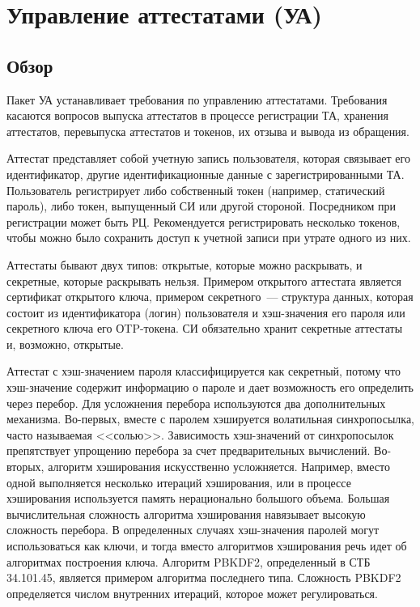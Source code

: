 \section{Управление аттестатами (УА)}\label{CM}

\subsection{Обзор}\label{CM.Intro}

Пакет УА устанавливает требования по управлению аттестатами.
Требования касаются вопросов выпуска аттестатов в процессе регистрации ТА,
хранения аттестатов, перевыпуска аттестатов и токенов, их отзыва и вывода из
обращения.

Аттестат представляет собой учетную запись пользователя, которая связывает
его идентификатор, другие идентификационные данные с зарегистрированными ТА.
%
Пользователь регистрирует либо собственный токен (например, статический пароль), 
либо токен, выпущенный СИ или другой стороной. 
%
Посредником при регистрации может быть РЦ. Рекомендуется регистрировать 
несколько токенов, чтобы можно было сохранить доступ к учетной записи при 
утрате одного из них.


Аттестаты бывают двух типов: открытые, которые можно раскрывать, и 
секретные, которые раскрывать нельзя. 
%
Примером открытого аттестата является сертификат открытого ключа, примером 
секретного~--- структура данных, которая состоит из идентификатора 
(логин) пользователя и хэш-значения его пароля или секретного ключа его 
ОTP-токена.
%
СИ обязательно хранит секретные аттестаты и, возможно, открытые.

Аттестат с хэш-значением пароля классифицируется как секретный, потому что 
хэш-значение содержит информацию о пароле и дает возможность его определить
через перебор.
%
Для усложнения перебора используются два дополнительных механизма.
%
Во-первых, вместе с паролем хэшируется волатильная синхропосылка, часто 
называемая <<солью>>. Зависимость хэш-значений от синхропосылок препятствует 
упрощению перебора за счет предварительных вычислений.
%
Во-вторых, алгоритм хэширования искусственно усложняется. Например, вместо одной
выполняется несколько итераций хэширования, или в процессе хэширования 
используется память нерационально большого объема.
%
Большая вычислительная сложность алгоритма хэширования навязывает высокую 
сложность перебора.
%
В определенных случаях хэш-значения паролей могут использоваться как ключи,
и тогда вместо алгоритмов хэширования речь идет об алгоритмах построения 
ключа. 
%
Алгоритм PBKDF2, определенный в СТБ 34.101.45, является примером алгоритма
последнего типа. Сложность PBKDF2 определяется числом внутренних итераций,
которое может регулироваться.

